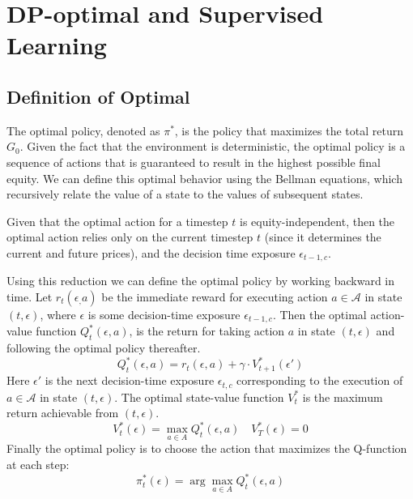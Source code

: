\section{DP-optimal and Supervised Learning}
\label{sec:optimal-sl}

\subsection{Definition of Optimal}

The optimal policy, denoted as $\pi^*$, is the policy that maximizes the total return $G_0$. Given the fact that the environment is deterministic, the optimal policy is a sequence of actions that is guaranteed to result in the highest possible final equity. We can define this optimal behavior using the Bellman equations, which recursively relate the value of a state to the values of subsequent states.

Given that the optimal action for a timestep $t$ is equity-independent, then the optimal action relies only on the current timestep $t$ (since it determines the current and future prices), and the decision time exposure $\epsilon_{t-1,c}$.  


Using this reduction we can define the optimal policy by working backward in time. Let $r_t(\epsilon_, a)$ be the immediate reward for executing action $a \in \mathcal{A}$ in state $(t, \epsilon)$, where $\epsilon$ is some decision-time exposure $\epsilon_{t-1,c}$. Then the optimal action-value function $Q^*_t(\epsilon,a)$, is the return for taking action $a$ in state $(t,\epsilon)$ and following the optimal policy thereafter. 
$$
Q^*_t(\epsilon,a) = r_t(\epsilon, a) + \gamma \cdot V^*_{t+1}(\epsilon')
$$
Here $\epsilon'$ is the next decision-time exposure $\epsilon_{t,c}$ corresponding to the execution of $a \in \mathcal{A}$ in state $(t, \epsilon)$. The optimal state-value function $V^*_{t}$ is the maximum return achievable from $(t, \epsilon)$. 
$$
V_t^*(\epsilon) = \max_{a \in A}{Q^*_t(\epsilon, a)} \quad V_T^*(\epsilon) = 0
$$
Finally the optimal policy is to choose the action that maximizes the Q-function at each step:
$$
\pi_t^*(\epsilon) = \arg\max_{a \in A}{Q^*_t(\epsilon, a)} 
$$

